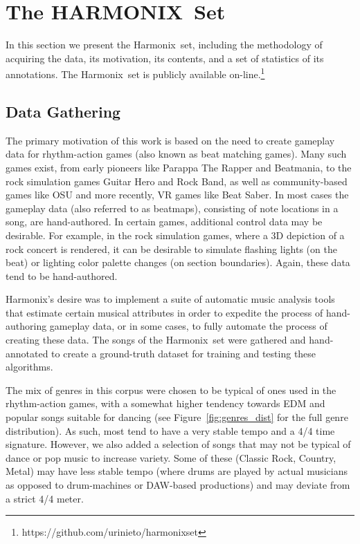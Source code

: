 \documentclass{article}
\newcommand{\setNameUpper}{HARMONIX}
\newcommand{\setName}{Harmonix}
\begin{document}
\section{The \setNameUpper~Set}\label{sec:dataset}

In this section we present the \setName~set, including the methodology of acquiring the data, its motivation, its contents, and a set of statistics of its annotations.
The \setName~set is publicly available on-line.\footnote{https://github.com/urinieto/harmonixset}

\subsection{Data Gathering}

The primary motivation of this work is based on the need to create gameplay data for rhythm-action games (also known as beat matching games). Many such games exist, from early pioneers like Parappa The Rapper and Beatmania, to the rock simulation games Guitar Hero and Rock Band, as well as community-based games like OSU and more recently, VR games like Beat Saber. In most cases the gameplay data (also referred to as beatmaps), consisting of note locations in a song, are hand-authored. In certain games, additional control data may be desirable. For example, in the rock simulation games, where a 3D depiction of a rock concert is rendered, it can be desirable to simulate flashing lights (on the beat) or lighting color palette changes (on section boundaries). Again, these data tend to be hand-authored.

Harmonix's desire was to implement a suite of automatic music analysis tools that estimate certain musical attributes in order to expedite the process of hand-authoring gameplay data, or in some cases, to fully automate the process of creating these data. The songs of the \setName~set were gathered and hand-annotated to create a ground-truth dataset for training and testing these algorithms.

The mix of genres in this corpus were chosen to be typical of ones used in the rhythm-action games, with a somewhat higher tendency towards EDM and popular songs suitable for dancing (see Figure~\ref{fig:genres_dist} for the full genre distribution).
As such, most tend to have a very stable tempo and a 4/4 time signature. 
However, we also added a selection of songs that may not be typical of dance or pop music to increase variety.
Some of these (Classic Rock, Country, Metal) may have less stable tempo (where drums are played by actual musicians as opposed to drum-machines or DAW-based productions) and may deviate from a strict 4/4 meter. 
\end{document}
